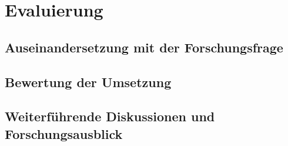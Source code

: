 % 


 

\chapter{Evaluierung} \label{cha:evaluation}
\section{Auseinandersetzung mit der Forschungsfrage}
\section{Bewertung der Umsetzung}\label{cha:rating}
\section{Weiterführende Diskussionen und Forschungsausblick} 
 